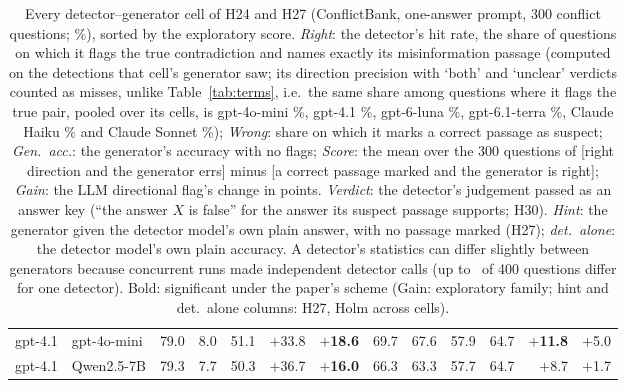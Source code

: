 \begin{table}[t]
\begin{tabular}{llrrrrrrrrrrr}
gpt-4.1 & gpt-4o-mini & 79.0 & 8.0 & 51.1 & $+$33.8 & \textbf{$+$18.6} & 69.7 & 67.6 & 57.9 & 64.7 & \textbf{$+$11.8} & $+$5.0 \\
gpt-4.1 & Qwen2.5-7B & 79.3 & 7.7 & 50.3 & $+$36.7 & \textbf{$+$16.0} & 66.3 & 63.3 & 57.7 & 64.7 & $+$8.7 & $+$1.7 \\
\bottomrule
\end{tabular}
\caption{Every detector--generator cell of H24 and H27 (ConflictBank, one-answer prompt, 300 conflict questions; \%),
sorted by the exploratory score. \emph{Right}: the detector's hit rate, the share of questions on which it flags the true
contradiction and names exactly its misinformation passage (computed on the detections that cell's generator saw;
its direction precision with `both' and `unclear' verdicts counted as misses, unlike Table~\ref{tab:terms}, i.e.\ the
same share among questions where it flags the true pair, pooled over its cells, is
gpt-4o-mini \dirPrecMini\%, gpt-4.1 \dirPrecFour\%, gpt-6-luna \dirPrecLuna\%, gpt-6.1-terra \dirPrecTerra\%, Claude Haiku
\dirPrecHaiku\% and Claude Sonnet \dirPrecSonnet\%); \emph{Wrong}: share on which it marks a correct passage as suspect;
\emph{Gen.\ acc.}: the generator's accuracy with no flags; \emph{Score}: the mean over the 300 questions of [right direction and the generator errs] minus [a
correct passage marked and the generator is right]; \emph{Gain}: the LLM directional flag's change in points. \emph{Verdict}: the detector's judgement passed as an answer key (``the answer $X$ is false'' for the answer its suspect passage supports; H30). \emph{Hint}: the
generator given the detector model's own plain answer, with no passage marked (H27); \emph{det.\ alone}: the detector
model's own plain accuracy. A detector's statistics can differ slightly between generators because concurrent runs
made independent detector calls (up to \detDiffMax\ of 400 questions differ for one detector). Bold: significant under
the paper's scheme (Gain: exploratory family; hint and det.\ alone columns: H27, Holm across cells).}
\label{tab:cells}
\end{table}

